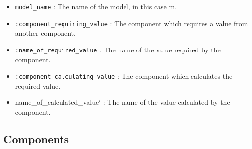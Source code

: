 \documentclass[
]{article}
\providecommand{\tightlist}{%
  \setlength{\itemsep}{0pt}\setlength{\parskip}{0pt}}
\begin{document}
\begin{itemize}
\tightlist
\item
  \texttt{model\_name} : The name of the model, in this case m.
\item
  \texttt{:component\_requiring\_value} : The component which requires a
  value from another component.
\item
  \texttt{:name\_of\_required\_value} : The name of the value required
  by the component.
\item
  \texttt{:component\_calculating\_value} : The component which
  calculates the required value.
\item
  name\_of\_calculated\_value` : The name of the value calculated by the
  component.
\end{itemize}

\subsection{Components}\label{components}
\end{document}
